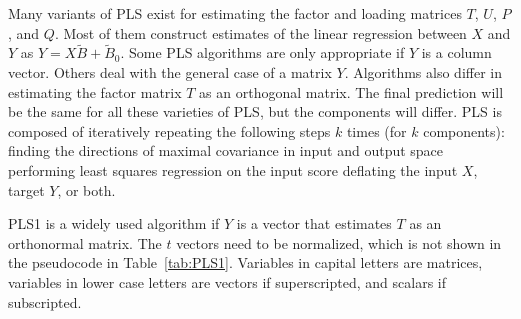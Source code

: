\documentclass[preprint,12pt]{elsarticle}
\begin{document}
Many variants of PLS exist for estimating the factor and loading matrices $T$, $U$, $P$, and $Q$. Most of them construct estimates of the linear regression between $X$ and $Y$ as $Y=X{\tilde{B}}+{\tilde{B}}_{0}$. Some PLS algorithms are only appropriate if $Y$ is a column vector. Others deal with the general case of a matrix $Y$. Algorithms also differ in estimating the factor matrix $T$ as an orthogonal matrix. The final prediction will be the same for all these varieties of PLS, but the components will differ.
PLS is composed of iteratively repeating the following steps $k$ times (for $k$ components):
finding the directions of maximal covariance in input and output space performing least squares regression on the input score deflating the input $X$, target $Y$, or both.

PLS1 is a widely used algorithm if $Y$ is a vector that estimates $T$ as an orthonormal matrix. The $t$ vectors need to be normalized, which is not shown in the pseudocode in Table~\ref{tab:PLS1}. Variables in capital letters are matrices, variables in lower case letters are vectors if superscripted, and scalars if subscripted.
\end{document}

